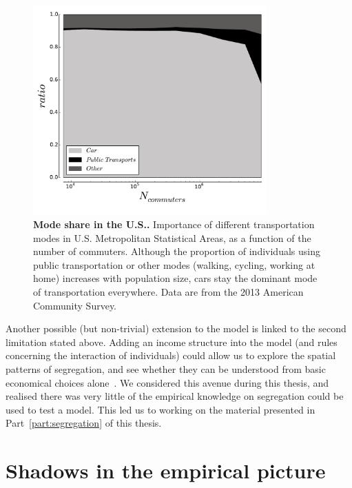 \begin{figure}[!h]
    \centering
    \includegraphics[width=0.8\textwidth]{gfx/chapter-monocentric/transportation_modes.pdf}
    \caption{{\bf Mode share in the U.S..} Importance of different transportation modes in U.S. Metropolitan
    Statistical Areas, as a function of the number of commuters. Although the
proportion of individuals using public transportation or other modes (walking,
cycling, working at home) increases with population size, cars stay the dominant
mode of transportation everywhere. Data are from the 2013 American Community
Survey.\label{fig:transportation_mode}}
\end{figure}


Another possible (but non-trivial) extension to the model is linked to the
second limitation stated above. Adding an income structure into the model (and
rules concerning the interaction of individuals) could allow us to explore the
spatial patterns of segregation, and see whether they can be understood from
basic economical choices alone~\cite{Gauvin:2013}. We considered this avenue
during this thesis, and realised there was very little of the empirical
knowledge on segregation could be used to test a model. This led us to working
on the material presented in Part~\ref{part:segregation} of this thesis.\\



\medskip

\section{Shadows in the empirical picture}
\label{sec:empirical}

